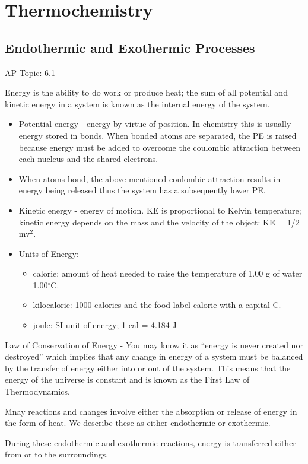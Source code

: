 \documentclass[../chem.tex]{subfiles}
\begin{document}
\chapter{Thermochemistry}
\section{Endothermic and Exothermic Processes}
AP Topic: 6.1

Energy is the ability to do work or produce heat; the sum of all potential and kinetic energy in a system is known as the internal energy of the system.
\begin{itemize}
    \item Potential energy - energy by virtue of position. In chemistry this is usually energy stored in bonds. When bonded atoms are separated, the PE is raised because energy must be added to overcome the coulombic attraction between each nucleus and the shared electrons. 
    \item When atoms bond, the above mentioned coulombic attraction results in energy being released thus the system has a subsequently lower PE.
    \item Kinetic energy - energy of motion. KE is proportional to Kelvin temperature; kinetic energy depends on the mass and the velocity of the object: KE = 1/2 mv$^2$.
    \item Units of Energy:
    \begin{itemize}
        \item calorie: amount of heat needed to raise the temperature of 1.00 g of water 1.00$^{\circ}$C.
        \item kilocalorie: 1000 calories and the food label calorie with a capital C.
        \item joule: SI unit of energy; 1 cal = 4.184 J 
    \end{itemize}
\end{itemize}

Law of Conservation of Energy - You may know it as ``energy is never created nor destroyed'' which implies that any change in energy of a system 
must be balanced by the transfer of energy either into or out of the system. This means that the energy of the universe is constant and is known as the First Law of Thermodynamics.

Mnay reactions and changes involve either the absorption or release of energy in the form of heat. We describe these as either endothermic or exothermic.

During these endothermic and exothermic reactions, energy is transferred either from or to the surroundings.
\end{document}
